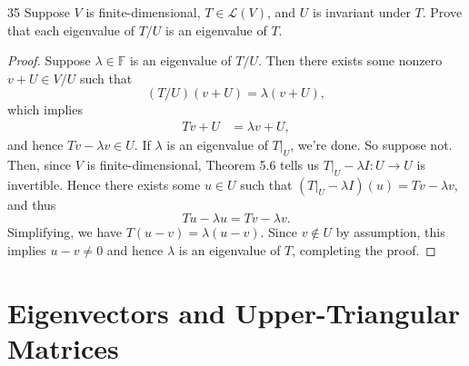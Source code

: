 \documentclass[11pt]{extarticle}
\newenvironment{problem}[1]{\begin{prob*}{#1}{}}{\end{prob*}}
\newcommand{\F}{\mathbb{F}}
\newcommand{\Hom}{\mathcal{L}}
\newcommand{\restr}[1]{|_{#1}}
\begin{document}
\begin{problem}{35}
Suppose $V$ is finite-dimensional, $T\in\Hom(V)$, and $U$ is invariant under $T$.  Prove that each eigenvalue of $T/U$ is an eigenvalue of $T$.
\end{problem}
\begin{proof}
Suppose $\lambda\in\F$ is an eigenvalue of $T/U$.  Then there exists some nonzero $v + U\in V/U$ such that 
\begin{equation*}
(T/U)(v + U) = \lambda(v + U),
\end{equation*} 
which implies
\begin{align*}
Tv + U &= \lambda v + U,
\end{align*}
and hence $Tv - \lambda v \in U$.  If $\lambda$ is an eigenvalue of $T\restr{U}$, we're done.  So suppose not.  Then, since $V$ is finite-dimensional, Theorem 5.6 tells us $T\restr{U}-\lambda I: U\to U$ is invertible.  Hence there exists some $u\in U$ such that $(T\restr{U}-\lambda I)(u) = Tv - \lambda v$, and thus
\begin{equation*}
Tu - \lambda u = Tv - \lambda v.
\end{equation*}
Simplifying, we have $T(u - v) = \lambda(u - v)$.  Since $v\not\in U$ by assumption, this implies $u - v\neq 0$ and hence $\lambda$ is an eigenvalue of $T$, completing the proof. 
\end{proof}
\section{Eigenvectors and Upper-Triangular Matrices}
\end{document}
